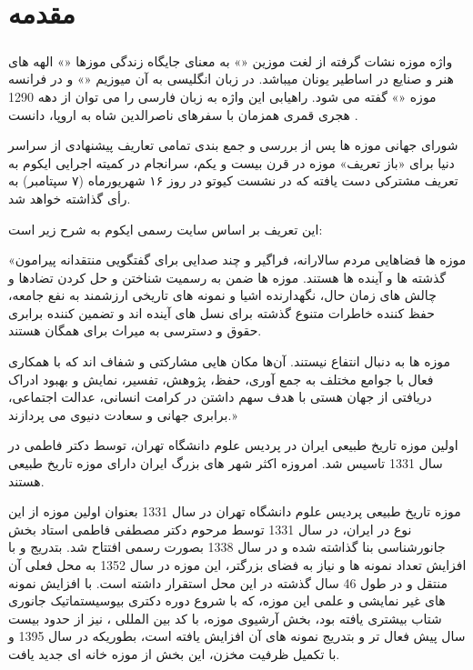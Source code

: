 
\chapter{مقدمه} \label{chapter:introduction}

\paragraph*{}

واژه موزه نشات گرفته از لغت موزین «» به معنای جایگاه زندگی موزها «» الهه های هنر و صنایع در اساطیر یونان میباشد. در زبان انگلیسی به آن میوزیم «» و در فرانسه موزه «» گفته می شود. راهیابی این واژه به زبان فارسی را می توان از دهه 1290 هجری قمری همزمان با سفرهای ناصرالدین شاه به اروپا، دانست .

شورای جهانی موزه ها پس از بررسی و جمع بندی تمامی تعاریف پیشنهادی از سراسر دنیا برای «باز تعریف» موزه در قرن بیست و یکم، سرانجام در کمیته اجرایی ایکوم به تعریف مشترکی دست یافته که در نشست کیوتو در روز ۱۶ شهریورماه (۷ سپتامبر) به رأی گذاشته خواهد شد.

این تعریف بر اساس سایت رسمی ایکوم به شرح زیر است:

«موزه ها فضاهایی مردم سالارانه، فراگیر و چند صدایی برای گفتگویی منتقدانه پیرامون گذشته ها و آینده ها هستند. موزه ها ضمن به رسمیت شناختن و حل کردن تضادها و چالش های زمان حال، نگهدارنده اشیا و نمونه های تاریخی ارزشمند به نفع جامعه، حفظ کننده خاطرات متنوع گذشته برای نسل های آینده اند و تضمین کننده برابری حقوق و دسترسی به میراث برای همگان هستند.

موزه ها به دنبال انتفاع نیستند. آن‌ها مکان هایی مشارکتی و شفاف اند که با همکاری فعال با جوامع مختلف به جمع آوری، حفظ، پژوهش، تفسیر، نمایش و بهبود ادراک دریافتی از جهان هستی با هدف سهم داشتن در کرامت انسانی، عدالت اجتماعی، برابری جهانی و سعادت دنیوی می پردازند.»

اولین موزه تاریخ طبیعی ایران در پردیس علوم دانشگاه تهران، توسط دکتر فاطمی در سال 1331 تاسیس شد. امروزه اکثر شهر های بزرگ ایران دارای موزه تاریخ طبیعی هستند.

موزه تاریخ طبیعی پردیس علوم دانشگاه تهران در سال 1331 بعنوان اولین موزه از این نوع در ایران، در سال 1331 توسط مرحوم دکتر مصطفی فاطمی استاد بخش جانورشناسی بنا گذاشته شده و در سال 1338 بصورت رسمی افتتاح شد. بتدریج و با افزایش تعداد نمونه ها و نیاز به فضای بزرگتر، این موزه در سال 1352 به محل فعلی آن منتقل و در طول 46 سال گذشته در این محل استقرار داشته است. با افزایش نمونه های غیر نمایشی و علمی این موزه، که با شروع دوره دکتری بیوسیستماتیک جانوری شتاب بیشتری یافته بود، بخش آرشیوی موزه، با کد بین المللی ، نیز از حدود بیست سال پیش فعال تر و بتدریج نمونه های آن افزایش یافته است، بطوریکه در سال 1395 و با تکمیل ظرفیت مخزن، این بخش از موزه خانه ای جدید یافت.

